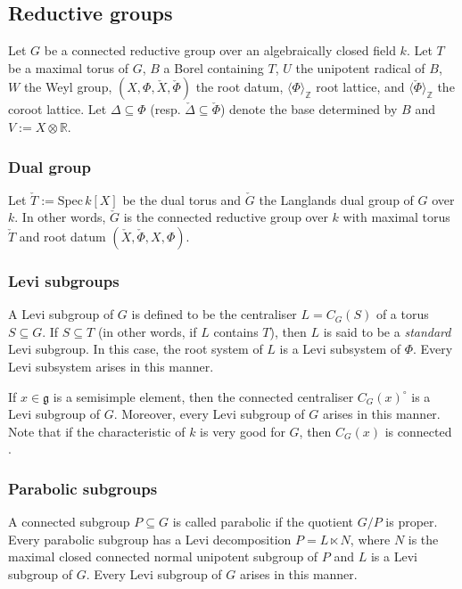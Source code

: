 \documentclass[12pt]{amsart}
\theoremstyle{plain}
\theoremstyle{definition}
\theoremstyle{remark}
\newcommand{\bZ}{\mathbb{Z}}
\newcommand{\fg}{\mathfrak{g}}
\newcommand{\chG}{\check{G}}
\newcommand{\chT}{\check{T}}
\newcommand{\bbR}{\mathbb{R}}
\begin{document}
\subsection{Reductive groups} \label{s:Reductive} Let $G$ be a connected reductive group over an algebraically closed field $k$. Let $T$ be a maximal torus of $G$, $B$ a Borel containing $T$, $U$ the unipotent radical of $B$, $W$ the Weyl group, $(X,  \Phi, \check{X}, \check{\Phi})$ the root datum,  $\langle \Phi \rangle_\bZ$  root lattice, and $\langle \check{\Phi} \rangle_\bZ$  the coroot lattice. Let $\Delta\subseteq \Phi$ (resp. $\check{\Delta}\subseteq \check{\Phi}$) denote the base determined by $B$ and $V:=X\otimes \bbR$.  
  
 
\subsubsection{Dual group} 
Let $\chT:=\mathrm{Spec}\, k[X]$ be the dual torus and $\chG$ the Langlands dual group of $G$ over $k$. In other words, $\chG$ is the connected reductive group over $k$ with maximal torus $\chT$ and root datum $(\check{X}, \check{\Phi}, X, \Phi)$. 









\subsubsection{Levi subgroups} A Levi subgroup of $G$ is defined to be the centraliser $L=C_G(S)$ of a torus $S\subseteq G$. If $S\subseteq T$ (in other words, if $L$ contains $T$), then $L$ is said to be a \emph{standard} Levi subgroup. In this case, the root system of $L$ is a Levi subsystem of $\Phi$. Every Levi subsystem arises in this manner. 

If $x\in \fg$ is a semisimple element, then the connected centraliser $C_{G}(x)^\circ$ is a Levi subgroup of $G$. Moreover, every Levi subgroup of $G$ arises in this manner. Note that if the characteristic of $k$ is very good for $G$, then $C_G(x)$ is connected \cite[Theorem 3.14]{Steinberg75}. 

\subsubsection{Parabolic subgroups}   \label{s:parabolic} A connected subgroup $P\subseteq G$ is called parabolic if the quotient $G/P$ is proper. Every parabolic subgroup has a Levi decomposition $P=L\ltimes N$, where $N$ is the maximal closed connected normal unipotent subgroup of $P$ and $L$ is a Levi subgroup of $G$. Every Levi subgroup of $G$ arises in this manner.  
\end{document}
